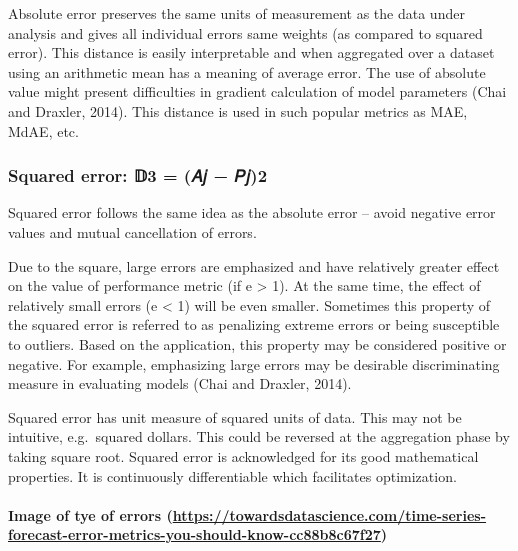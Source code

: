 \documentclass[
]{article}
\begin{document}
Absolute error preserves the same units of measurement as the data under
analysis and gives all individual errors same weights (as compared to
squared error). This distance is easily interpretable and when
aggregated over a dataset using an arithmetic mean has a meaning of
average error. The use of absolute value might present difficulties in
gradient calculation of model parameters (Chai and Draxler, 2014). This
distance is used in such popular metrics as MAE, MdAE, etc.

\hypertarget{squared-error-ux1d53b3-ux1d434ux1d457-ux1d443ux1d4572}{%
\subsubsection{Squared error: 𝔻3 = (𝐴𝑗 −
𝑃𝑗)2}\label{squared-error-ux1d53b3-ux1d434ux1d457-ux1d443ux1d4572}}

Squared error follows the same idea as the absolute error -- avoid
negative error values and mutual cancellation of errors.

Due to the square, large errors are emphasized and have relatively
greater effect on the value of performance metric (if e \textgreater{}
1). At the same time, the effect of relatively small errors (e
\textless{} 1) will be even smaller. Sometimes this property of the
squared error is referred to as penalizing extreme errors or being
susceptible to outliers. Based on the application, this property may be
considered positive or negative. For example, emphasizing large errors
may be desirable discriminating measure in evaluating models (Chai and
Draxler, 2014).

Squared error has unit measure of squared units of data. This may not be
intuitive, e.g.~squared dollars. This could be reversed at the
aggregation phase by taking square root. Squared error is acknowledged
for its good mathematical properties. It is continuously differentiable
which facilitates optimization.

\hypertarget{image-of-tye-of-errors-httpstowardsdatascience.comtime-series-forecast-error-metrics-you-should-know-cc88b8c67f27}{%
\paragraph{\texorpdfstring{Image of tye of errors
(\url{https://towardsdatascience.com/time-series-forecast-error-metrics-you-should-know-cc88b8c67f27})}{Image of tye of errors (https://towardsdatascience.com/time-series-forecast-error-metrics-you-should-know-cc88b8c67f27)}}\label{image-of-tye-of-errors-httpstowardsdatascience.comtime-series-forecast-error-metrics-you-should-know-cc88b8c67f27}}
\end{document}
